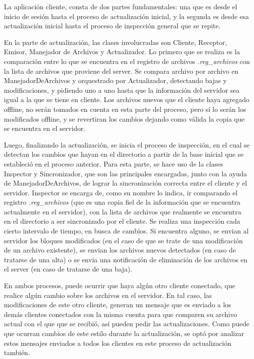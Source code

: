\documentclass{article}
\begin{document}
	La aplicación cliente, consta de dos partes fundamentales: una que es desde el inicio de sesión hasta el proceso de actualización inicial, y la segunda es desde esa actualización inicial hasta el proceso de inspección general que se repite. 
	\par
	En la parte de actualización, las clases involucradas son Cliente, Receptor, Emisor, Manejador de Archivos y Actualizador. Lo primero que se realiza es la comparación entre lo que se encuentra en el registro de archivos \textit{.reg_archivos} con la lista de archivos que proviene del server. Se compara archivo por archivo en ManejadorDeArchivos y orquestrado por Actualizador, detectando bajas y modificaciones, y pidiendo uno a uno hasta que la información del servidor sea igual a la que se tiene en cliente. Los archivos nuevos que el cliente haya agregado offline, no serán tomados en cuenta en esta parte del proceso, pero sí lo serán los modificados offline, y se revertiran los cambios dejando como válida la copia que se encuentra en el servidor.
	\par
	Luego, finalizando la actualización, se inicia el proceso de inspección, en el cual se detectan los cambios que hayan en el directorio a partir de la base inicial que se estableció en el proceso anterior. Para esta parte, se hace uso de la clases Inspector y Sincronizador, que son las principales encargadas, junto con la ayuda de ManejadorDeArchivos, de lograr la sincronización correcta entre el cliente y el servidor. 
	Inspector se encarga de, como su nombre lo indica, ir comparando el registro \textit{.reg_archivos} (que es una copia fiel de la información que se encuentra actualmente en el servidor), con la lista de archivos que realmente se encuentra en el directorio a ser sincronizado por el cliente. Se realiza una inspección cada cierto intervalo de tiempo, en busca de cambios. Si encuentra alguno, se envian al servidor los bloques modificados (en el caso de que se trate de una modificación de un archivo existente), se envian los archivos nuevos detectados (en caso de tratarse de una alta) o se envia una notificación de eliminación de los archivos en el server (en caso de tratarse de una baja). 
	\par
	En ambos procesos, puede ocurrir que haya algún otro cliente conectado, que realice algún cambio sobre los archivos en el servidor. En tal caso, las modificaciones de este otro cliente, generan un mensaje que es enviado a los demás clientes conectados con la misma cuenta para que comparen su archivo actual con el que que se recibió, así pueden pedir las actualizaciones. Como puede que ocurran cambios de este estilo durante la actualización, se optó por analizar estos mensajes enviados a todos los clientes en este proceso de actualización también.
\bigskip
\end{document}
